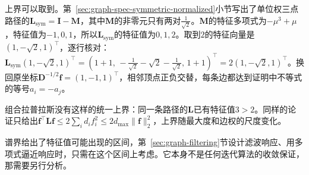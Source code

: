 上界可以取到。第~\ref{sec:graph-spec-symmetric-normalized}小节写出了单位权三点路径的$\bm L_{\mathrm{sym}}=\bm I-\bm M$，其中$\bm M$的非零元只有两对$\tfrac1{\sqrt2}$。$\bm M$的特征多项式为$-\mu^3+\mu$，特征值为$-1,0,1$，所以$\bm L_{\mathrm{sym}}$的特征值为$0,1,2$。取到$2$的特征向量是$(1,-\sqrt2,1)^{\top}$，逐行核对：$\bm L_{\mathrm{sym}}(1,-\sqrt2,1)^{\top}=(1+1,\,-\tfrac1{\sqrt2}-\sqrt2-\tfrac1{\sqrt2},\,1+1)^{\top}=2(1,-\sqrt2,1)^{\top}$。换回原坐标$\bm D^{-1/2}\bm f=(1,-1,1)^{\top}$，相邻顶点正负交替，每条边都达到证明中不等式的等号$a_i=-a_j$。

组合拉普拉斯没有这样的统一上界：同一条路径的$\bm L$已有特征值$3>2$。同样的论证只给出$\bm f^{\top}\bm L\bm f\leq2\sum_id_if_i^2\leq2d_{\max}\lVert\bm f\rVert_2^2$，上界随最大度和边权的尺度变化。

谱界给出了特征值可能出现的区间，第~\ref{sec:graph-filtering}节设计滤波响应、用多项式逼近响应时，只需在这个区间上考虑。它本身不是任何迭代算法的收敛保证，那需要另行分析。
